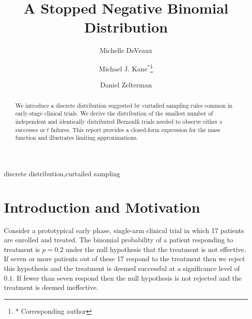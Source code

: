 \documentclass[review]{elsarticle}
\begin{document}
\begin{frontmatter}

\title{A Stopped Negative Binomial Distribution}


\author{Michelle DeVeaux}

\author{Michael J. Kane$^*$\footnote{* Corresponding author}}

\author{Daniel Zelterman}

\address{Department of Biostatistics\\ School of Epidemiology and Public Health\\ Yale University, New Haven, CT}

\begin{abstract}
We introduce a discrete distribution suggested by curtailed
sampling rules common in early-stage clinical trials. We derive the
distribution of the smallest number of independent and identically
distributed Bernoulli trials needed to observe either $s$ successes 
or $t$ failures. This report provides a closed-form expression for the 
mass function and illustrates limiting approximations.
\end{abstract}

\begin{keyword}
discrete distribution\sep curtailed sampling
\end{keyword}

\end{frontmatter}

\linenumbers

\section{Introduction and Motivation}

Consider a prototypical early phase, single-arm clinical trial in which 
17 patients
are enrolled and treated. The binomial probability of a patient 
responding to treatment is $p=0.2$ 
under the null hypothesis that the treatment is not effective.
If seven or more patients out of these 17 respond to the treatment then we 
reject this hypothesis and the treatment is deemed successful at 
a significance level of $0.1$.  If fewer than seven respond then the null 
hypothesis is not 
rejected and the treatment is deemed ineffective.
\end{document}
